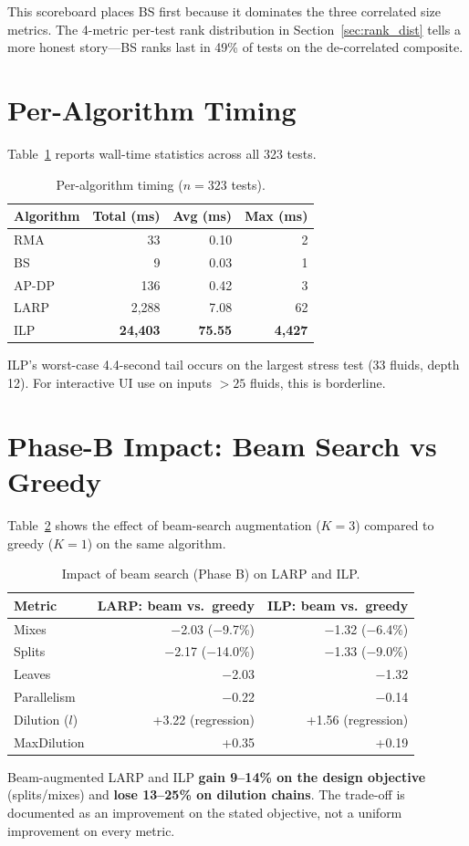 This scoreboard places BS first because it dominates the three correlated size metrics. The 4-metric per-test rank distribution in Section~\ref{sec:rank_dist} tells a more honest story---BS ranks last in 49\% of tests on the de-correlated composite.

\section{Per-Algorithm Timing}

Table~\ref{tab:timing} reports wall-time statistics across all 323 tests.

\begin{table}[H]
\centering
\caption{Per-algorithm timing ($n = 323$ tests).}
\label{tab:timing}
\begin{tabular}{|l|r|r|r|}
\hline
\textbf{Algorithm} & \textbf{Total (ms)} & \textbf{Avg (ms)} & \textbf{Max (ms)} \\
\hline
RMA & 33 & 0.10 & 2 \\
\hline
BS & 9 & 0.03 & 1 \\
\hline
AP-DP & 136 & 0.42 & 3 \\
\hline
LARP & 2,288 & 7.08 & 62 \\
\hline
ILP & \textbf{24,403} & \textbf{75.55} & \textbf{4,427} \\
\hline
\end{tabular}
\end{table}

ILP's worst-case 4.4-second tail occurs on the largest stress test (33 fluids, depth 12). For interactive UI use on inputs $> 25$ fluids, this is borderline.

\section{Phase-B Impact: Beam Search vs Greedy}

Table~\ref{tab:beam_impact} shows the effect of beam-search augmentation ($K = 3$) compared to greedy ($K = 1$) on the same algorithm.

\begin{table}[H]
\centering
\caption{Impact of beam search (Phase B) on LARP and ILP.}
\label{tab:beam_impact}
\begin{tabular}{|l|r|r|}
\hline
\textbf{Metric} & \textbf{LARP: beam vs.\ greedy} & \textbf{ILP: beam vs.\ greedy} \\
\hline
Mixes & $-$2.03 ($-$9.7\%) & $-$1.32 ($-$6.4\%) \\
\hline
Splits & $-$2.17 ($-$14.0\%) & $-$1.33 ($-$9.0\%) \\
\hline
Leaves & $-$2.03 & $-$1.32 \\
\hline
Parallelism & $-$0.22 & $-$0.14 \\
\hline
Dilution ($l$) & +3.22 (regression) & +1.56 (regression) \\
\hline
MaxDilution & +0.35 & +0.19 \\
\hline
\end{tabular}
\end{table}

Beam-augmented LARP and ILP \textbf{gain 9--14\% on the design objective} (splits/mixes) and \textbf{lose 13--25\% on dilution chains}. The trade-off is documented as an improvement on the stated objective, not a uniform improvement on every metric.
